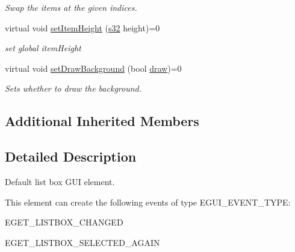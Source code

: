 \begin{DoxyCompactItemize}
\begin{DoxyCompactList}\small\item\em Swap the items at the given indices. \end{DoxyCompactList}\item 
\mbox{\label{classirr_1_1gui_1_1IGUIListBox_a83fb9c6f32039a39197cf799dd5e0c8f}} 
virtual void \hyperlink{classirr_1_1gui_1_1IGUIListBox_a83fb9c6f32039a39197cf799dd5e0c8f}{set\+Item\+Height} (\hyperlink{namespaceirr_ac66849b7a6ed16e30ebede579f9b47c6}{s32} height)=0
\begin{DoxyCompactList}\small\item\em set global item\+Height \end{DoxyCompactList}\item 
\mbox{\label{classirr_1_1gui_1_1IGUIListBox_ad323fdf0b083dbc1870d7fa5869cff8f}} 
virtual void \hyperlink{classirr_1_1gui_1_1IGUIListBox_ad323fdf0b083dbc1870d7fa5869cff8f}{set\+Draw\+Background} (bool \hyperlink{classirr_1_1gui_1_1IGUIElement_a1ef7eeaff67b8a9f4f37cacdc7e54be2}{draw})=0
\begin{DoxyCompactList}\small\item\em Sets whether to draw the background. \end{DoxyCompactList}\end{DoxyCompactItemize}
\subsection*{Additional Inherited Members}


\subsection{Detailed Description}
Default list box G\+UI element. 

\begin{DoxyParagraph}{This element can create the following events of type E\+G\+U\+I\+\_\+\+E\+V\+E\+N\+T\+\_\+\+T\+Y\+PE\+:}
\begin{DoxyItemize}
\item E\+G\+E\+T\+\_\+\+L\+I\+S\+T\+B\+O\+X\+\_\+\+C\+H\+A\+N\+G\+ED \item E\+G\+E\+T\+\_\+\+L\+I\+S\+T\+B\+O\+X\+\_\+\+S\+E\+L\+E\+C\+T\+E\+D\+\_\+\+A\+G\+A\+IN \end{DoxyItemize}

\end{DoxyParagraph}


